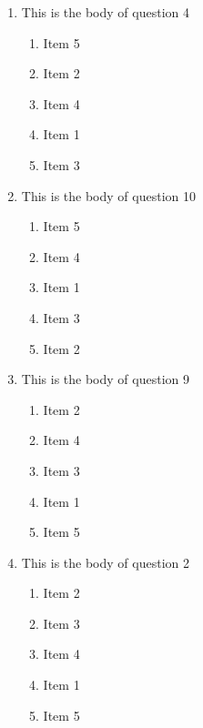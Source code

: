 \documentclass[amsfonts,bezier,leqno,fleqn,12pt,a4paper]{article}
\begin{document}
{\begin{large}
\begin{enumerate}
\begin{enumerate}
\end{enumerate}

\vspace {3.5cm}


\item This is the body of question 4
\vspace {0.3in}
\setcounter{equation}{0}

\begin{enumerate}
\item  Item 5
\item  Item 2
\item  Item 4
\item  Item 1
\item  Item 3

\end{enumerate}
\newpage


\item This is the body of question 10
\vspace {0.3in}
\setcounter{equation}{0}

\begin{enumerate}
\item  Item 5
\item  Item 4
\item  Item 1
\item  Item 3
\item  Item 2

\end{enumerate}

\vspace {3.5cm}


\item This is the body of question 9
\vspace {0.3in}
\setcounter{equation}{0}

\begin{enumerate}
\item  Item 2
\item  Item 4
\item  Item 3
\item  Item 1
\item  Item 5

\end{enumerate}
\newpage


\item This is the body of question 2
\vspace {0.3in}
\setcounter{equation}{0}

\begin{enumerate}
\item  Item 2
\item  Item 3
\item  Item 4
\item  Item 1
\item  Item 5


\end{enumerate}
\end{enumerate}
\end{large}}
\end{document}
